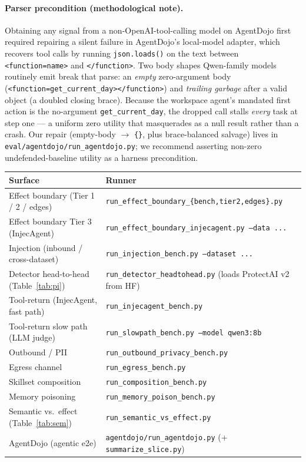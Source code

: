 \documentclass[11pt]{article}
\newcommand{\code}[1]{\texttt{\small #1}}
\begin{document}
\paragraph{Parser precondition (methodological note).} Obtaining any signal from a
non-OpenAI-tool-calling model on AgentDojo first required repairing a silent failure in AgentDojo's
local-model adapter, which recovers tool calls by running \code{json.loads()} on the text between
\code{<function=name>} and \code{</function>}. Two body shapes Qwen-family models routinely emit
break that parse: an \emph{empty} zero-argument body
(\code{<function=get\_current\_day></function>}) and \emph{trailing garbage} after a valid object (a
doubled closing brace). Because the workspace agent's mandated first action is the no-argument
\code{get\_current\_day}, the dropped call stalls \emph{every} task at step one --- a uniform zero
utility that masquerades as a null result rather than a crash. Our repair (empty-body $\to$
\code{\{\}}, plus brace-balanced salvage) lives in \code{eval/agentdojo/run\_agentdojo.py}; we
recommend asserting non-zero undefended-baseline utility as a harness precondition.

\begin{center}\footnotesize
\begin{tabular}{lL{7.8cm}}
\toprule
Surface & Runner \\
\midrule
Effect boundary (Tier 1 / 2 / edges) & \code{run\_effect\_boundary\_\{bench,tier2,edges\}.py} \\
Effect boundary Tier 3 (InjecAgent) & \code{run\_effect\_boundary\_injecagent.py --data ...} \\
Injection (inbound / cross-dataset) & \code{run\_injection\_bench.py --dataset ...} \\
Detector head-to-head (Table~\ref{tab:pi}) & \code{run\_detector\_headtohead.py} (loads ProtectAI v2 from HF) \\
Tool-return (InjecAgent, fast path) & \code{run\_injecagent\_bench.py} \\
Tool-return slow path (LLM judge) & \code{run\_slowpath\_bench.py --model qwen3:8b} \\
Outbound / PII & \code{run\_outbound\_privacy\_bench.py} \\
Egress channel & \code{run\_egress\_bench.py} \\
Skillset composition & \code{run\_composition\_bench.py} \\
Memory poisoning & \code{run\_memory\_poison\_bench.py} \\
Semantic vs.\ effect (Table~\ref{tab:sem}) & \code{run\_semantic\_vs\_effect.py} \\
AgentDojo (agentic e2e) & \code{agentdojo/run\_agentdojo.py} (+ \code{summarize\_slice.py}) \\
\bottomrule
\end{tabular}
\end{center}
\end{document}
